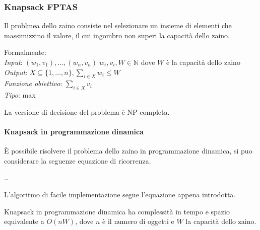 \subsubsection{Knapsack FPTAS}
Il problmea dello zaino consiste nel selezionare un insieme 
di elementi che massimizzino il valore, il cui ingombro non superi
la capacità dello zaino.

Formalmente:\\
\emph{Input}: $(w_1, v_1), \dots, (w_n, v_n)\;w_i, v_i, W \in \mathbb{N}$ dove $W$ è la capacità dello zaino\\
\emph{Output}: $X \subseteq \{1, \dots, n\}, \sum_{i \in X} w_i \leq W$\\
\emph{Funzione obiettivo}: $\sum_{i \in X} v_i$\\
\emph{Tipo}: max

La versione di decisione del problema è NP completa.

\paragraph{Knapsack in programmazione dinamica}
È possibile risolvere il problema dello zaino in programmazione dinamica, 
si puo considerare la seguenze equazione di ricorrenza.

\dots

L'algoritmo di facile implementazione segue l'equazione appena introdotta.

\begin{theorem}
    Knapsack in programmazione dinamica ha complessità in tempo e spazio equivalente a 
    $O(nW)$, dove $n$ è il numero di oggetti e $W$ la capacità dello zaino.
\end{theorem}